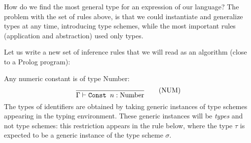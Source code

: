 How do we find the most general type for an expression of our language?
The problem with the set of rules above, is that we could instantiate and
generalize types at any time, introducing type schemes, while the most
important rules (application and abstraction) used only types.

Let us write a new set of inference rules that we will read as an algorithm
(close to a Prolog program):
\par\noindent
Any numeric constant is of type Number:
\[
\frac{}
{\Gamma \vdash \mbox{\tt Const } n : \mbox{Number}}\mbox{\qquad(NUM)}
\]
The types of identifiers are obtained by taking generic instances of
type schemes appearing in the typing environment. These generic
instances will be {\em types} and not type schemes: this restriction
appears in the rule below, where the type $\tau$ is expected to be a
generic instance of the type scheme $\sigma$.

